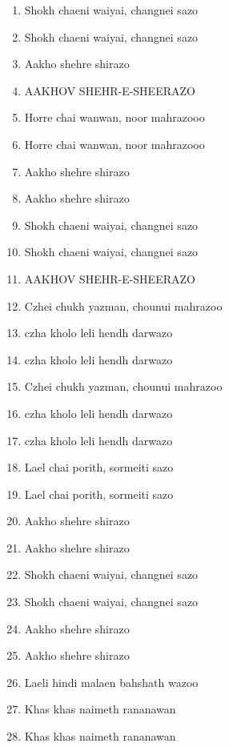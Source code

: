 \documentclass[12pt]{article}
\newcommand{\bigroman}[1]{\fontsize{16pt}{18pt}\selectfont\RaggedRight #1}
\begin{document}
\begin{multicols}{2}
\begin{enumerate}[leftmargin=*, label=\arabic*., font=\fontsize{16pt}{18pt}\selectfont]
  \item \bigroman{Shokh chaeni waiyai, changnei sazo}
  \item \bigroman{Shokh chaeni waiyai, changnei sazo}
  \item \bigroman{Aakho shehre shirazo}
  \item \bigroman{AAKHOV SHEHR-E-SHEERAZO}
  \item \bigroman{Horre chai wanwan, noor mahrazooo}
  \item \bigroman{Horre chai wanwan, noor mahrazooo}
  \item \bigroman{Aakho shehre shirazo}
  \item \bigroman{Aakho shehre shirazo}
  \item \bigroman{Shokh chaeni waiyai, changnei sazo}
  \item \bigroman{Shokh chaeni waiyai, changnei sazo}
  \item \bigroman{AAKHOV SHEHR-E-SHEERAZO}
  \item \bigroman{Czhei chukh yazman, chounui mahrazoo}
  \item \bigroman{czha kholo leli hendh darwazo}
  \item \bigroman{czha kholo leli hendh darwazo}
  \item \bigroman{Czhei chukh yazman, chounui mahrazoo}
  \item \bigroman{czha kholo leli hendh darwazo}
  \item \bigroman{czha kholo leli hendh darwazo}
  \item \bigroman{Lael chai porith, sormeiti sazo}
  \item \bigroman{Lael chai porith, sormeiti sazo}
  \item \bigroman{Aakho shehre shirazo}
  \item \bigroman{Aakho shehre shirazo}
  \item \bigroman{Shokh chaeni waiyai, changnei sazo}
  \item \bigroman{Shokh chaeni waiyai, changnei sazo}
  \item \bigroman{Aakho shehre shirazo}
  \item \bigroman{Aakho shehre shirazo}
  \item \bigroman{Laeli hindi malaen bahshath wazoo}
  \item \bigroman{Khas khas naimeth rananawan}
  \item \bigroman{Khas khas naimeth rananawan}

\end{enumerate}
\end{multicols}
\end{document}
